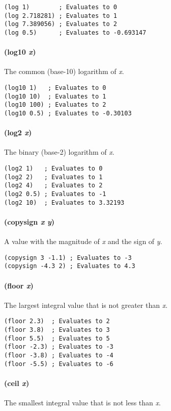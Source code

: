 \documentclass[numbers=noenddot]{scrbook}
\begin{document}
\begin{verbatim}
(log 1)        ; Evaluates to 0
(log 2.718281) ; Evaluates to 1
(log 7.389056) ; Evaluates to 2
(log 0.5)      ; Evaluates to -0.693147
\end{verbatim}

\paragraph{(log10 \emph{x})}
The common (base-10) logarithm of \emph{x}.

\begin{verbatim}
(log10 1)   ; Evaluates to 0
(log10 10)  ; Evaluates to 1
(log10 100) ; Evaluates to 2
(log10 0.5) ; Evaluates to -0.30103
\end{verbatim}

\paragraph{(log2 \emph{x})}
The binary (base-2) logarithm of \emph{x}.

\begin{verbatim}
(log2 1)   ; Evaluates to 0
(log2 2)   ; Evaluates to 1
(log2 4)   ; Evaluates to 2
(log2 0.5) ; Evaluates to -1
(log2 10)  ; Evaluates to 3.32193
\end{verbatim}

\paragraph{(copysign \emph{x} \emph{y})}
A value with the magnitude of \emph{x} and the sign of \emph{y}.

\begin{verbatim}
(copysign 3 -1.1) ; Evaluates to -3
(copysign -4.3 2) ; Evaluates to 4.3
\end{verbatim}

\paragraph{(floor \emph{x})}
The largest integral value that is not greater than \emph{x}.

\begin{verbatim}
(floor 2.3)  ; Evaluates to 2
(floor 3.8)  ; Evaluates to 3
(floor 5.5)  ; Evaluates to 5
(floor -2.3) ; Evaluates to -3
(floor -3.8) ; Evaluates to -4
(floor -5.5) ; Evaluates to -6
\end{verbatim}

\paragraph{(ceil \emph{x})}
The smallest integral value that is not less than \emph{x}.
\end{document}

